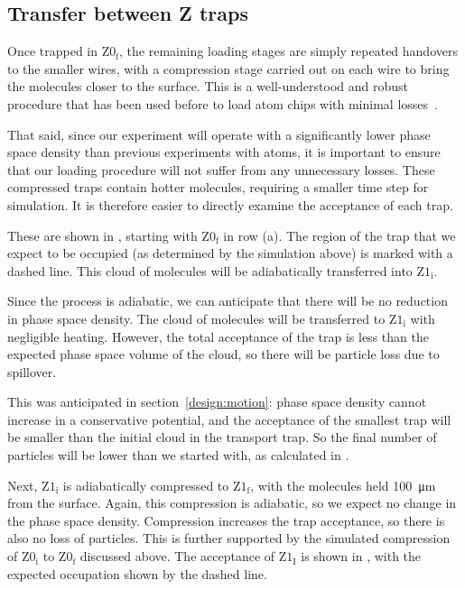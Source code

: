 \subsection{Transfer between Z traps}
\label{design:transferbetweenzs}

Once trapped in $\mathrm{Z0_f}$, the remaining loading stages are simply
repeated handovers to the smaller wires, with a compression stage carried out
on each wire to bring the molecules closer to the surface. This is a
well-understood and robust procedure that has been used before to load atom
chips with minimal losses~\cite{Reichel2002}.

That said, since our experiment will operate with a significantly lower phase
space density than previous experiments with atoms, it is important to ensure
that our loading procedure will not suffer from any unnecessary losses. These
compressed traps contain hotter molecules, requiring a smaller time step for
simulation. It is therefore easier to directly examine the acceptance of each
trap.

These are shown in , starting with
$\mathrm{Z0_f}$ in row (a). The region of the trap that we expect to be
occupied (as determined by the simulation above) is marked with a dashed line.
This cloud of molecules will be adiabatically transferred into $\mathrm{Z1_i}$.

Since the process is adiabatic, we can anticipate that there will be no
reduction in phase space density. The cloud of molecules will be transferred to
$\mathrm{Z1_i}$ with negligible heating. However, the total acceptance of the
trap is less than the expected phase space volume of the cloud, so there
will be particle loss due to spillover.

This was anticipated in section~\ref{design:motion}: phase space density cannot
increase in a conservative potential, and the acceptance of the smallest trap
will be smaller than the initial cloud in the transport trap. So the final
number of particles will be lower than we started with, as calculated in
.

Next, $\mathrm{Z1_i}$ is adiabatically compressed to $\mathrm{Z1_f}$, with the
molecules held \SI{100}{\micro\meter} from the surface. Again, this
compression is adiabatic, so we expect no change in the phase space density.
Compression increases the trap acceptance, so there is also no loss of
particles. This is further supported by the simulated compression of
$\mathrm{Z0_i}$ to $\mathrm{Z0_f}$ discussed above. The acceptance of
$\mathrm{Z1_I}$ is shown in , with
the expected occupation shown by the dashed line.

